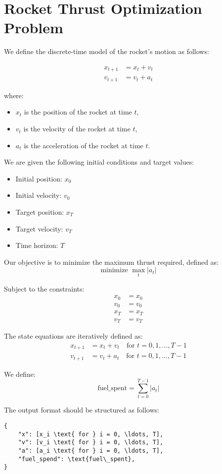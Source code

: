 \documentclass{article}
\begin{document}
\section*{Rocket Thrust Optimization Problem}

We define the discrete-time model of the rocket's motion as follows:

\begin{align}
    x_{t+1} &= x_t + v_t \\
    v_{t+1} &= v_t + a_t
\end{align}

where:
\begin{itemize}
    \item \(x_t\) is the position of the rocket at time \(t\),
    \item \(v_t\) is the velocity of the rocket at time \(t\),
    \item \(a_t\) is the acceleration of the rocket at time \(t\).
\end{itemize}

We are given the following initial conditions and target values:
\begin{itemize}
    \item Initial position: \(x_0\)
    \item Initial velocity: \(v_0\)
    \item Target position: \(x_T\)
    \item Target velocity: \(v_T\)
    \item Time horizon: \(T\)
\end{itemize}

Our objective is to minimize the maximum thrust required, defined as:
\[
\text{minimize } \max_{t} |a_t|
\]

Subject to the constraints:
\begin{align}
    x_0 &= x_0 \\
    v_0 &= v_0 \\
    x_T &= x_T \\
    v_T &= v_T
\end{align}

The state equations are iteratively defined as:
\begin{align}
    x_{t+1} &= x_t + v_t \quad \text{for } t = 0, 1, \ldots, T-1 \\
    v_{t+1} &= v_t + a_t \quad \text{for } t = 0, 1, \ldots, T-1
\end{align}

We define:
\[
\text{fuel\_spent} = \sum_{t=0}^{T-1} |a_t|
\]

The output format should be structured as follows:

\begin{verbatim}
{
    "x": [x_i \text{ for } i = 0, \ldots, T],
    "v": [v_i \text{ for } i = 0, \ldots, T],
    "a": [a_i \text{ for } i = 0, \ldots, T],
    "fuel_spend": \text{fuel\_spent},
}
\end{verbatim}
\end{document}
